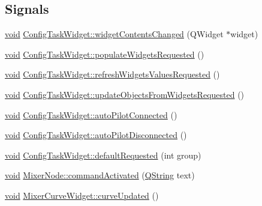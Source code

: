 \subsection*{\-Signals}
\begin{DoxyCompactItemize}
\item 
\hyperlink{group___u_a_v_objects_plugin_ga444cf2ff3f0ecbe028adce838d373f5c}{void} \hyperlink{group___u_a_v_object_widget_utils_gaee198ff7978d5358a93395eb215fa767}{\-Config\-Task\-Widget\-::widget\-Contents\-Changed} (\-Q\-Widget $\ast$widget)
\item 
\hyperlink{group___u_a_v_objects_plugin_ga444cf2ff3f0ecbe028adce838d373f5c}{void} \hyperlink{group___u_a_v_object_widget_utils_gacc1be196d23d5e483f68a990d8ebfae6}{\-Config\-Task\-Widget\-::populate\-Widgets\-Requested} ()
\item 
\hyperlink{group___u_a_v_objects_plugin_ga444cf2ff3f0ecbe028adce838d373f5c}{void} \hyperlink{group___u_a_v_object_widget_utils_ga6d4f37af17f3990fd37e9eddbb8f3802}{\-Config\-Task\-Widget\-::refresh\-Widgets\-Values\-Requested} ()
\item 
\hyperlink{group___u_a_v_objects_plugin_ga444cf2ff3f0ecbe028adce838d373f5c}{void} \hyperlink{group___u_a_v_object_widget_utils_gae43eee3bcf829dcfc91b17c25bc5db95}{\-Config\-Task\-Widget\-::update\-Objects\-From\-Widgets\-Requested} ()
\item 
\hyperlink{group___u_a_v_objects_plugin_ga444cf2ff3f0ecbe028adce838d373f5c}{void} \hyperlink{group___u_a_v_object_widget_utils_ga6812138654a8b49e72c674cee7245781}{\-Config\-Task\-Widget\-::auto\-Pilot\-Connected} ()
\item 
\hyperlink{group___u_a_v_objects_plugin_ga444cf2ff3f0ecbe028adce838d373f5c}{void} \hyperlink{group___u_a_v_object_widget_utils_gab874b1ad732a19472dc1a9d29f23d7ae}{\-Config\-Task\-Widget\-::auto\-Pilot\-Disconnected} ()
\item 
\hyperlink{group___u_a_v_objects_plugin_ga444cf2ff3f0ecbe028adce838d373f5c}{void} \hyperlink{group___u_a_v_object_widget_utils_ga42fb0be146f76a7ce2ef34e655a3015a}{\-Config\-Task\-Widget\-::default\-Requested} (int group)
\item 
\hyperlink{group___u_a_v_objects_plugin_ga444cf2ff3f0ecbe028adce838d373f5c}{void} \hyperlink{group___u_a_v_object_widget_utils_ga942a3a9bcc32e276d18b155ef73298f1}{\-Mixer\-Node\-::command\-Activated} (\hyperlink{group___u_a_v_objects_plugin_gab9d252f49c333c94a72f97ce3105a32d}{\-Q\-String} text)
\item 
\hyperlink{group___u_a_v_objects_plugin_ga444cf2ff3f0ecbe028adce838d373f5c}{void} \hyperlink{group___u_a_v_object_widget_utils_ga90255ec9acd8db01306ae5f9af229f39}{\-Mixer\-Curve\-Widget\-::curve\-Updated} ()

\end{DoxyCompactItemize}
